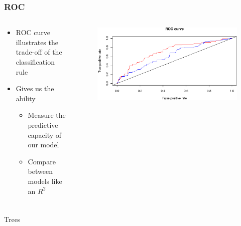 \documentclass[
  shownotes,
  xcolor={svgnames},
  hyperref={colorlinks,citecolor=DarkBlue,linkcolor=DarkRed,urlcolor=DarkBlue}
  , aspectratio=169]{beamer}
\begin{document}
\begin{frame}[fragile]
\frametitle{ROC}



\begin{columns}[T] %
\begin{column}{.52\textwidth}
\begin{itemize}
\item ROC curve illustrates the trade-off of the classification rule
\medskip
\item Gives us the ability
\begin{itemize}
  \item Measure the predictive capacity of our model
  \medskip
  \item Compare between models  like an $R^2$
  \medskip
\end{itemize}
\end{itemize}
\end{column}  
\hfill
\begin{column}{.48\textwidth}

 \begin{figure}[H] \centering
            \captionsetup{justification=centering}
              \includegraphics[scale=0.38]{../Lecture19/figures/unnamed-chunk-11-1.pdf}
 \end{figure}

\end{column}
\end{columns}



\end{frame}
\begin{frame}[fragile]
\frametitle{}


\centering
{\huge \textcolor{andesred}{Trees}}



\end{frame}
\end{document}
